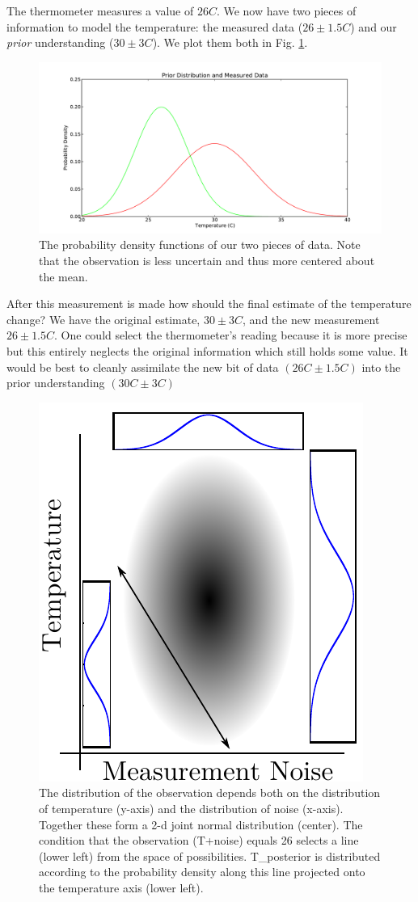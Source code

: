 The thermometer measures a value of $26C$. We now have two pieces of
information to model the temperature: the measured data ($26\pm1.5C$) and our \textit{prior}
understanding ($30\pm3C$). We plot them both in Fig. \ref{fig:DA_data}.

\begin{figure}[ht]
\vspace{-0pt}
\centering
\includegraphics[width=.7\textwidth]{images/data}
\vspace{-0pt}
\caption{The probability density functions of our two pieces of data. Note that the observation is less uncertain and thus more centered about the mean.}
\label{fig:DA_data}
\vspace{00pt}
\end{figure}

After this measurement is made how should the final estimate of the temperature change? We have the original estimate, $30 \pm 3C$, and the new measurement $26 \pm 1.5C$. One could select the thermometer's reading because it is more precise but this entirely neglects the original information which still holds some value. It would be best to cleanly assimilate the new bit of data $(26C \pm 1.5C)$ into the prior understanding $(30C \pm 3C)$

\begin{figure}[ht]
\vspace{-0pt}
\centering
\includegraphics[width=.3\textwidth]{images/temperature_given}
\vspace{-0pt}
\caption{The distribution of the observation depends both on the distribution of temperature (y-axis) and the distribution of noise (x-axis). Together these form a 2-d joint normal distribution (center). The condition that the observation (T+noise) equals 26 selects a line (lower left) from the space of possibilities. T\_posterior is distributed according to the probability density along this line projected onto the temperature axis (lower left).}
\label{fig:temperature_given}
\vspace{00pt}
\end{figure}

